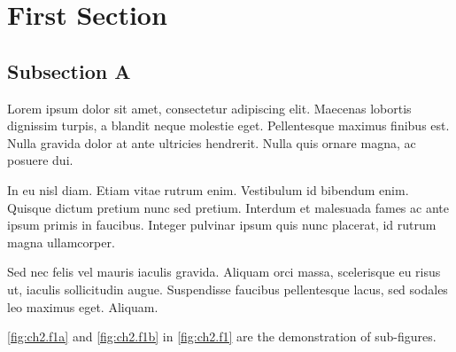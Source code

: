     \par\section{First Section}\label{sec:ch2.sec1}
    \par\subsection{Subsection A}\label{sec:ch2.sec1.subsec1}
    \par\noindent Lorem ipsum dolor sit amet, consectetur adipiscing elit. Maecenas lobortis dignissim turpis, a blandit neque molestie eget. Pellentesque maximus finibus est. Nulla gravida dolor at ante ultricies hendrerit. Nulla quis ornare magna, ac posuere dui.
    \par\noindent In eu nisl diam. Etiam vitae rutrum enim. Vestibulum id bibendum enim. Quisque dictum pretium nunc sed pretium. Interdum et malesuada fames ac ante ipsum primis in faucibus. Integer pulvinar ipsum quis nunc placerat, id rutrum magna ullamcorper.
    \par\noindent Sed nec felis vel mauris iaculis gravida. Aliquam orci massa, scelerisque eu risus ut, iaculis sollicitudin augue. Suspendisse faucibus pellentesque lacus, sed sodales leo maximus eget. Aliquam. 
    \par\noindent \autoref{fig:ch2.f1a} and \autoref{fig:ch2.f1b} in \autoref{fig:ch2.f1} are the demonstration of sub-figures.
